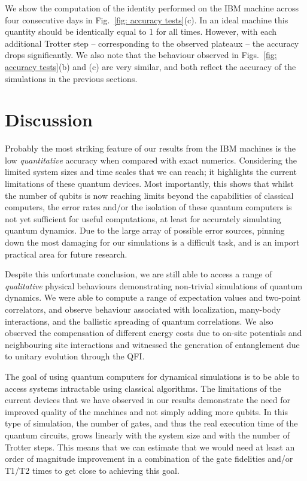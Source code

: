 \documentclass[twocolumn,showpacs,preprintnumbers,nofootinbib,amsmath,aps,pra,longbibliography,amssymb,superscriptaddress]{revtex4-1}
\begin{document}
We show the computation of the identity performed on the IBM machine across four consecutive days in Fig.~\ref{fig: accuracy tests}(c). In an ideal machine this quantity should be identically equal to 1 for all times. However, with each additional Trotter step -- corresponding to the observed plateaux -- the accuracy drops significantly. We also note that the behaviour observed in Figs.~\ref{fig: accuracy tests}(b) and (c) are very similar, and both reflect the accuracy of the simulations in the previous sections.





\section*{Discussion}\label{sec: discussion}


Probably the most striking feature of our results from the IBM machines is the low \emph{quantitative} accuracy when compared with exact numerics. Considering the limited system sizes and time scales that we can reach; it highlights the current limitations of these quantum devices. Most importantly, this shows that whilst the number of qubits is now reaching limits beyond the capabilities of classical computers, the error rates and/or the isolation of these quantum computers is not yet sufficient for useful computations, at least for accurately simulating quantum dynamics. Due to the large array of possible error sources, pinning down the most damaging for our simulations is a difficult task, and is an import practical area for future research.

Despite this unfortunate conclusion, we are still able to access a range of \emph{qualitative} physical behaviours demonstrating non-trivial simulations of quantum dynamics. We were able to compute a range of expectation values and two-point correlators, and observe behaviour associated with localization, many-body interactions, and the ballistic spreading of quantum correlations. We also observed the compensation of different energy costs due to on-site potentials and neighbouring site interactions and witnessed the generation of entanglement due to unitary evolution through the QFI. 

The goal of using quantum computers for dynamical simulations is to be able to access systems intractable using classical algorithms. The limitations of the current devices that we have observed in our results demonstrate the need for improved quality of the machines and not simply adding more qubits. In this type of simulation, the number of gates, and thus the real execution time of the quantum circuits, grows linearly with the system size and with the number of Trotter steps. This means that we can estimate that we would need at least an order of magnitude improvement in a combination of the gate fidelities and/or T1/T2 times to get close to achieving this goal.
\end{document}
